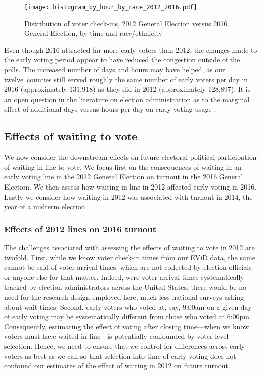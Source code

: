 \documentclass[12pt,titlepage]{article}
\newcommand{\numcounties}{twelve}
\begin{document}
\begin{figure}[!ht]
  \caption{Distribution of voter check-ins, 2012 General Election
    versus 2016 General Election, by time and race/ethnicity}
  \label{fig:race2012and2016}
  \centering
  \centering\texttt{[image: histogram\_by\_hour\_by\_race\_2012\_2016.pdf]}
\end{figure}

Even though 2016 attracted far more early voters than 2012, the
changes made to the early voting period appear to have reduced the
congestion outside of the polls. The increased number of days and
hours may have helped, as our \numcounties\ counties still served
roughly the same number of early voters per day in 2016 (approximately
131,918) as they did in 2012 (approximately 128,897). It is an open
question in the literature on election administration as to the
marginal effect of additional days versus hours per day on early
voting usage \citep[e.g.,][]{walkeretal:ncearly}.



\subsection*{Effects of waiting to vote}

We now consider the downstream effects on future electoral political
participation of waiting in line to vote. We focus first on the
consequences of waiting in an early voting line in the 2012 General
Election on turnout in the 2016 General Election. We then assess how
waiting in line in 2012 affected early voting in 2016. Lastly we
consider how waiting in 2012 was associated with turnout in 2014, the
year of a midterm election.

\subsubsection*{Effects of 2012 lines on 2016 turnout}

The challenges associated with assessing the effects of waiting to
vote in 2012 are twofold.  First, while we know voter check-in times
from our EViD data, the same cannot be said of voter arrival times,
which are not collected by election officials or anyone else for that
matter.  Indeed, were voter arrival times systematically tracked by
election administrators across the United States, there would be no
need for the research design employed here, much less national surveys
asking about wait times.  Second, early voters who voted at, say,
9:00am on a given day of early voting may be systematically different
from those who voted at 6:00pm. Consequently, estimating the effect of
voting after closing time---when we know voters must have waited in
line---is potentially confounded by voter-level selection.  Hence, we
need to ensure that we control for differences across early voters as
best as we can so that selection into time of early voting does not
confound our estimates of the effect of waiting in 2012 on future
turnout.
\end{document}
